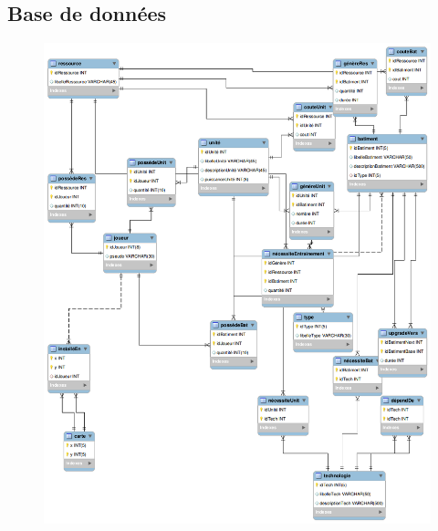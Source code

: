 \documentclass[11pt,a4paper]{article}
\begin{document}
\subsection{Base de données}
\begin{figure}[!h]
\includegraphics[scale=0.3]{./sql/last.png}
\end{figure}
\end{document}
